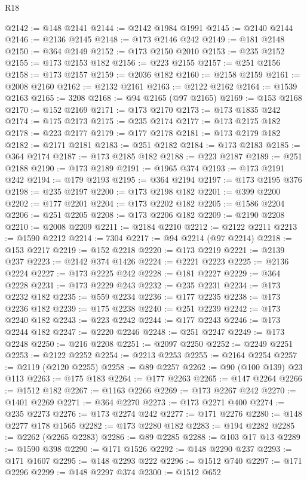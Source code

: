 \begin{lexlean}{R18}
\begin{coremodule}
@2142 := @148 @2141
@2144 := @2142 @1984 @1991
@2145 := @2140 @2144
@2146 := @2136 @2145
@2148 := @173 @2146 @242
@2149 := @181 @2148
@2150 := @364 @2149
@2152 := @173 @2150 @2010
@2153 := @235 @2152
@2155 := @173 @2153 @182
@2156 := @223 @2155
@2157 := @251 @2156
@2158 := @173 @2157
@2159 := @2036 @182
@2160 := @2158 @2159
@2161 := @2008 @2160
@2162 := @2132 @2161
@2163 := @2122 @2162
@2164 := @1539 @2163
@2165 := 3208
@2168 := @94 @2165 (@97 @2165)
@2169 := @153 @2168
@2170 := @152 @2169
@2171 := @173 @2170
@2173 := @173 @1835 @242
@2174 := @175 @2173
@2175 := @235 @2174
@2177 := @173 @2175 @182
@2178 := @223 @2177
@2179 := @177 @2178
@2181 := @173 @2179 @182
@2182 := @2171 @2181
@2183 := @251 @2182
@2184 := @173 @2183
@2185 := @364 @2174
@2187 := @173 @2185 @182
@2188 := @223 @2187
@2189 := @251 @2188
@2190 := @173 @2189
@2191 := @1965 @374
@2193 := @173 @2191 @242
@2194 := @179 @2193
@2195 := @364 @2194
@2197 := @173 @2195 @376
@2198 := @235 @2197
@2200 := @173 @2198 @182
@2201 := @399 @2200
@2202 := @177 @2201
@2204 := @173 @2202 @182
@2205 := @1586 @2204
@2206 := @251 @2205
@2208 := @173 @2206 @182
@2209 := @2190 @2208
@2210 := @2008 @2209
@2211 := @2184 @2210
@2212 := @2122 @2211
@2213 := @1590 @2212
@2214 := 7304
@2217 := @94 @2214 (@97 @2214)
@2218 := @153 @2217
@2219 := @152 @2218
@2220 := @173 @2219
@2221 := @2139 @237
@2223 := @2142 @374 @1426
@2224 := @2221 @2223
@2225 := @2136 @2224
@2227 := @173 @2225 @242
@2228 := @181 @2227
@2229 := @364 @2228
@2231 := @173 @2229 @243
@2232 := @235 @2231
@2234 := @173 @2232 @182
@2235 := @559 @2234
@2236 := @177 @2235
@2238 := @173 @2236 @182
@2239 := @175 @2238
@2240 := @251 @2239
@2242 := @173 @2240 @182
@2243 := @223 @2242
@2244 := @177 @2243
@2246 := @173 @2244 @182
@2247 := @2220 @2246
@2248 := @251 @2247
@2249 := @173 @2248
@2250 := @216 @2208
@2251 := @2097 @2250
@2252 := @2249 @2251
@2253 := @2122 @2252
@2254 := @2213 @2253
@2255 := @2164 @2254
@2257 := @2119 (@2120 @2255)
@2258 := @89 @2257
@2262 := @90 (@100 @139) @23 @113
@2263 := @175 @183
@2264 := @177 @2263
@2265 := @147 @2264
@2266 := @1512 @182
@2267 := @1163 @2266
@2269 := @173 @2267 @242
@2270 := @1401 @2269
@2271 := @364 @2270
@2273 := @173 @2271 @400
@2274 := @235 @2273
@2276 := @173 @2274 @242
@2277 := @171 @2276
@2280 := @148 @2277 @178 @1565
@2282 := @173 @2280 @182
@2283 := @194 @2282
@2285 := @2262 (@2265 @2283)
@2286 := @89 @2285
@2288 := @103 @17 @13
@2289 := @1590 @398
@2290 := @171 @1526
@2292 := @148 @2290 @237
@2293 := @171 @1607
@2295 := @148 @2293 @222
@2296 := @1512 @740
@2297 := @171 @2296
@2299 := @148 @2297 @374
@2300 := @1512 @652

\end{coremodule}
\end{lexlean}
